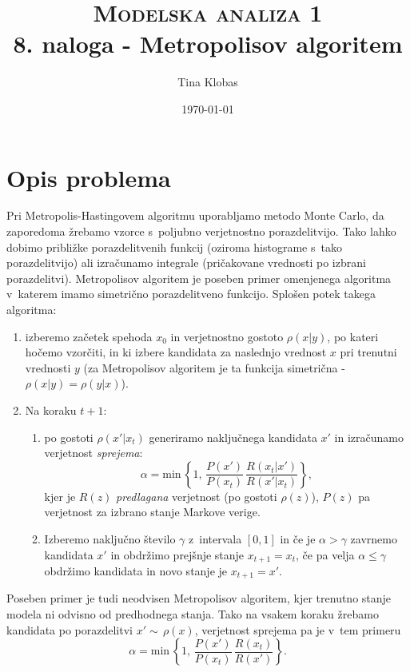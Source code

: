 \documentclass[a4paper,pdftex,10pt]{article}
\title{	
\normalfont \normalsize 
\textsc{Modelska analiza 1} \\ [25pt] %
\huge 8. naloga - Metropolisov algoritem\\ %
}
\author{Tina Klobas} %
\date{\normalsize\today} %
\numberwithin{figure}{section} %
\begin{document}
\maketitle %

\section{Opis problema}
Pri Metropolis-Hastingovem algoritmu uporabljamo metodo Monte Carlo, da zaporedoma žrebamo 
vzorce s~poljubno verjetnostno porazdelitvijo. Tako lahko dobimo približke porazdelitvenih
funkcij (oziroma histograme s~tako porazdelitvijo) ali izračunamo integrale (pričakovane
vrednosti po izbrani porazdelitvi). Metropolisov algoritem je poseben primer omenjenega
algoritma v~katerem imamo simetrično porazdelitveno funkcijo. Splošen potek takega
algoritma:
\begin{enumerate}
    \item izberemo začetek spehoda $x_0$ in verjetnostno gostoto $\rho (x|y)$, po
	kateri hočemo vzorčiti, in ki izbere kandidata za naslednjo vrednost $x$ pri 
	trenutni vrednosti $y$ (za Metropolisov algoritem je ta funkcija simetrična - 
	$\rho (x|y) = \rho (y|x)$).
    \item Na koraku $t+1$:
	\begin{enumerate}
	    \item po gostoti $\rho (x'|x_t)$ generiramo naključnega kandidata $x'$ in 
		izračunamo verjetnost \emph{sprejema}:
		\begin{equation}
		    \alpha = \mathrm{min} \, \left\{
			1, \, \frac{P(x')}{P(x_t)} \, \frac{R(x_t|x')}{R(x'|x_t)} \right\},
		\end{equation}
		kjer je $R(z)$ \emph{predlagana} verjetnost (po gostoti $\rho (z)$),
		$P(z)$ pa verjetnost za izbrano stanje Markove verige.
	    \item Izberemo naključno število $\gamma$ z~intervala $[0,1]$ in če je $\alpha 
		> \gamma $ zavrnemo kandidata $x'$ in obdržimo prejšnje stanje $x_{t+1} = 
		x_t$, če pa velja $\alpha \leq \gamma$ obdržimo kandidata in novo stanje je
		$x_{t+1} = x'$.
	\end{enumerate}
\end{enumerate}
Poseben primer je tudi neodvisen Metropolisov algoritem, kjer trenutno stanje modela ni 
odvisno od predhodnega stanja. Tako na vsakem koraku žrebamo kandidata po porazdelitvi 
$x' \sim \, \rho(x)$, verjetnost sprejema pa je v~tem primeru
\begin{equation} 
    \alpha = \mathrm{min} \, \left\{ 1, \, \frac{P(x')}{P(x_t)} \, \frac{R(x_t)}{R(x')} 
    \right\}.
\end{equation}
\end{document}
